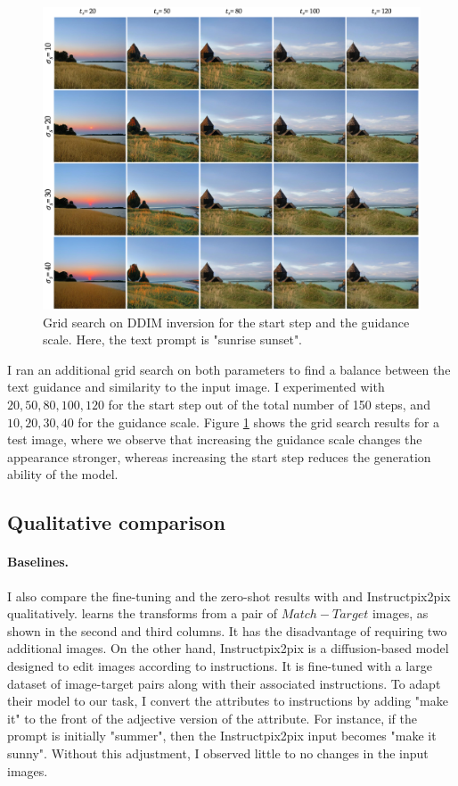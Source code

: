 \begin{figure}[ht]
  \includegraphics[width=\textwidth]{Chapters/zero-shot-tat-figs/grid-search.png}
  \caption{Grid search on DDIM inversion for the start step and the guidance scale. Here, the text prompt is "sunrise sunset".}
  \label{fig:zero-shot-grid-search}
\end{figure}

I ran an additional grid search on both parameters to find a balance between the text guidance and similarity to the input image. I experimented with $20, 50, 80, 100, 120$ for the start step out of the total number of 150 steps, and $10, 20, 30, 40$ for the guidance scale. Figure \ref{fig:zero-shot-grid-search} shows the grid search results for a test image, where we observe that increasing the guidance scale changes the appearance stronger, whereas increasing the start step reduces the generation ability of the model.


\subsection{Qualitative comparison}
\paragraph{Baselines.} I also compare the fine-tuning and the zero-shot results with \citeauthor{laffont2014transient} \cite{laffont2014transient} and Instructpix2pix \cite{brooks2023instructpix2pix} qualitatively. \citeauthor{laffont2014transient} \cite{laffont2014transient} learns the transforms from a pair of $Match - Target$ images, as shown in the second and third columns. It has the disadvantage of requiring two additional images. On the other hand, Instructpix2pix \cite{brooks2023instructpix2pix} is a diffusion-based model designed to edit images according to instructions. It is fine-tuned with a large dataset of image-target pairs along with their associated instructions. To adapt their model to our task, I convert the attributes to instructions by adding "make it" to the front of the adjective version of the attribute. For instance, if the prompt is initially "summer", then the Instructpix2pix input becomes "make it sunny". Without this adjustment, I observed  little to no changes in the input images.
 
